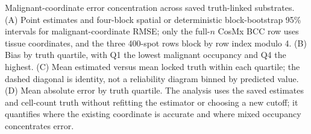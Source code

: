 Malignant-coordinate error concentration across saved truth-linked substrates. (A) Point estimates and four-block spatial or deterministic block-bootstrap 95\% intervals for malignant-coordinate RMSE; only the full-\(n\) CosMx BCC row uses tissue coordinates, and the three 400-spot rows block by row index modulo 4. (B) Bias by truth quartile, with Q1 the lowest malignant occupancy and Q4 the highest. (C) Mean estimated versus mean locked truth within each quartile; the dashed diagonal is identity, not a reliability diagram binned by predicted value. (D) Mean absolute error by truth quartile. The analysis uses the saved estimates and cell-count truth without refitting the estimator or choosing a new cutoff; it quantifies where the existing coordinate is accurate and where mixed occupancy concentrates error.
